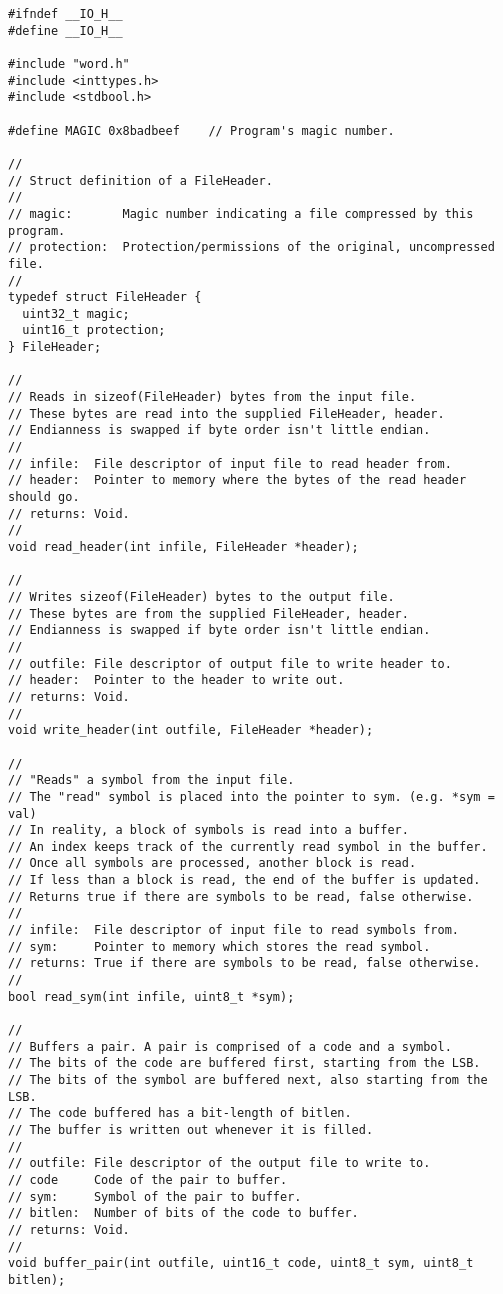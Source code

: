 \documentclass{article}
\begin{document}
\begin{lstlisting}[title=io.h]
#ifndef __IO_H__
#define __IO_H__

#include "word.h"
#include <inttypes.h>
#include <stdbool.h>

#define MAGIC 0x8badbeef    // Program's magic number.

//
// Struct definition of a FileHeader.
//
// magic:       Magic number indicating a file compressed by this program.
// protection:  Protection/permissions of the original, uncompressed file.
//
typedef struct FileHeader {
  uint32_t magic;
  uint16_t protection;
} FileHeader;

//
// Reads in sizeof(FileHeader) bytes from the input file.
// These bytes are read into the supplied FileHeader, header.
// Endianness is swapped if byte order isn't little endian.
//
// infile:  File descriptor of input file to read header from.
// header:  Pointer to memory where the bytes of the read header should go.
// returns: Void.
//
void read_header(int infile, FileHeader *header);

//
// Writes sizeof(FileHeader) bytes to the output file.
// These bytes are from the supplied FileHeader, header.
// Endianness is swapped if byte order isn't little endian.
//
// outfile: File descriptor of output file to write header to.
// header:  Pointer to the header to write out.
// returns: Void.
//
void write_header(int outfile, FileHeader *header);

//
// "Reads" a symbol from the input file.
// The "read" symbol is placed into the pointer to sym. (e.g. *sym = val)
// In reality, a block of symbols is read into a buffer.
// An index keeps track of the currently read symbol in the buffer.
// Once all symbols are processed, another block is read.
// If less than a block is read, the end of the buffer is updated.
// Returns true if there are symbols to be read, false otherwise.
//
// infile:  File descriptor of input file to read symbols from.
// sym:     Pointer to memory which stores the read symbol.
// returns: True if there are symbols to be read, false otherwise.
//
bool read_sym(int infile, uint8_t *sym);

//
// Buffers a pair. A pair is comprised of a code and a symbol.
// The bits of the code are buffered first, starting from the LSB.
// The bits of the symbol are buffered next, also starting from the LSB.
// The code buffered has a bit-length of bitlen.
// The buffer is written out whenever it is filled.
//
// outfile: File descriptor of the output file to write to.
// code     Code of the pair to buffer.
// sym:     Symbol of the pair to buffer.
// bitlen:  Number of bits of the code to buffer.
// returns: Void.
//
void buffer_pair(int outfile, uint16_t code, uint8_t sym, uint8_t bitlen);


\end{lstlisting}
\end{document}
